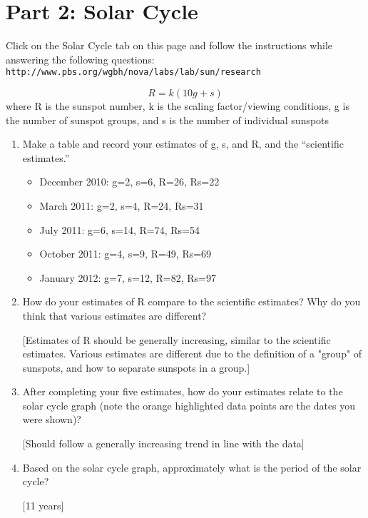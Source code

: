 \documentclass[11pt]{article}%
\begin{document}
\section*{Part 2: Solar Cycle}
Click on the Solar Cycle tab on this page and follow the instructions while answering the following questions: {\tt http://www.pbs.org/wgbh/nova/labs/lab/sun/research}

\begin{equation}
    R = k(10g+s)
\end{equation}
where R is the sunspot number, k is the scaling factor/viewing conditions, g is the number of sunspot groups, and s is the number of individual sunspots

\begin{enumerate}
\item Make a table and record your estimates of g, s, and R, and the ``scientific estimates.''
\begin{itemize}
    \item December 2010: g=2, s=6, R=26, R\textunderscore s=22
    \item March 2011: g=2, s=4, R=24, R\textunderscore s=31
    \item July 2011: g=6, s=14, R=74, R\textunderscore s=54
    \item October 2011: g=4, s=9, R=49, R\textunderscore s=69
    \item January 2012: g=7, s=12, R=82, R\textunderscore s=97
\end{itemize}
 \item How do your estimates of R compare to the scientific estimates? Why do you think that various estimates are different?
 
 [Estimates of R should be generally increasing, similar to the scientific estimates.  Various estimates are different due to the definition of a "group" of sunspots, and how to separate sunspots in a group.]
 
 \item  After completing your five estimates, how do your estimates relate to the solar cycle graph (note the orange highlighted data points are the dates you were shown)?
 
 [Should follow a generally increasing trend in line with the data]
 
 \item Based on the solar cycle graph, approximately what is the period of the solar cycle?
 
 [11 years]
 
\end{enumerate}
\end{document}
